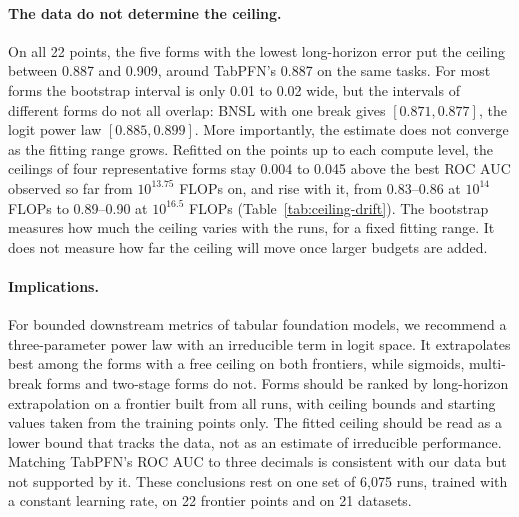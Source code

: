 \paragraph{The data do not determine the ceiling.}
On all 22 points, the five forms with the lowest long-horizon error put the ceiling between 0.887 and 0.909, around
TabPFN's 0.887 on the same tasks. For most forms the bootstrap interval is only 0.01 to 0.02 wide, but the intervals of
different forms do not all overlap: BNSL with one break gives $[0.871, 0.877]$, the logit power law $[0.885, 0.899]$.
More importantly, the estimate does not converge as the fitting range grows. Refitted on the points up to each compute
level, the ceilings of four representative forms stay 0.004 to 0.045 above the best ROC AUC observed so far from
$10^{13.75}$ FLOPs on, and rise with it, from 0.83--0.86 at $10^{14}$ FLOPs to 0.89--0.90 at $10^{16.5}$ FLOPs
(Table~\ref{tab:ceiling-drift}). The bootstrap
measures how much the ceiling varies with the runs, for a fixed fitting range. It does not measure how far the ceiling
will move once larger budgets are added.

\paragraph{Implications.}
For bounded downstream metrics of tabular foundation models, we recommend a three-parameter power law with an
irreducible term in logit space. It extrapolates best among the forms with a free ceiling on both frontiers, while
sigmoids, multi-break forms and two-stage forms do not. Forms should be ranked by long-horizon extrapolation on a
frontier built from all runs, with ceiling bounds and starting values taken from the training points only. The fitted
ceiling should be read as a lower bound that tracks the data, not as an estimate of irreducible performance. Matching
TabPFN's ROC AUC to three decimals is consistent with our data but not supported by it. These conclusions rest on one
set of 6{,}075 runs, trained with a constant learning rate, on 22 frontier points and on 21 datasets.
